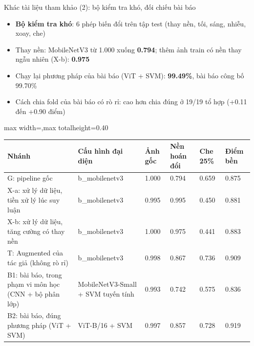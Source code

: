 \documentclass[aspectratio=169,10pt]{beamer}
\begin{document}
\begin{frame}{Khác tài liệu tham khảo (2): bộ kiểm tra khó, đối chiếu bài báo}
\begin{itemize}\footnotesize
\item \textbf{Bộ kiểm tra khó}: 6 phép biến đổi trên tập test (thay nền, tối, sáng, nhiễu, xoay, che)
\item Thay nền: MobileNetV3 từ 1.000 xuống \textbf{0.794}; thêm ảnh train có nền thay ngẫu nhiên (X-b): \textbf{0.975}
\item Chạy lại phương pháp của bài báo (ViT + SVM): \textbf{99.49\%}, bài báo công bố 99.70\%
\item Cách chia fold của bài báo có rò rỉ: cao hơn chia đúng ở 19/19 tổ hợp (+0.11 đến +0.90 điểm)
\end{itemize}
\begin{center}\begin{adjustbox}{max width=\linewidth,max totalheight=0.40\textheight}
\begin{tabular}{>{\raggedright\arraybackslash}p{5.4cm} >{\raggedright\arraybackslash}p{3.4cm} l l l l}\toprule
\textbf{Nhánh} & \textbf{Cấu hình đại diện} & \textbf{Ảnh gốc} & \textbf{Nền hoán đổi} & \textbf{Che 25\%} & \textbf{Điểm bền} \\ \midrule
G: pipeline gốc & b\_mobilenetv3 & 1.000 & 0.794 & 0.659 & 0.875 \\
X-a: xử lý dữ liệu, tiền xử lý lúc suy luận & b\_mobilenetv3 & 0.995 & 0.995 & 0.450 & 0.881 \\
X-b: xử lý dữ liệu, tăng cường có thay nền & b\_mobilenetv3 & 1.000 & 0.975 & 0.441 & 0.883 \\
T: Augmented của tác giả (không rò rỉ) & b\_mobilenetv3 & 0.998 & 0.867 & 0.736 & 0.909 \\
B1: bài báo, trong phạm vi môn học (CNN + bộ phân lớp) & MobileNetV3-Small + SVM tuyến tính & 0.993 & 0.742 & 0.575 & 0.836 \\
B2: bài báo, đúng phương pháp (ViT + SVM) & ViT-B/16 + SVM & 0.997 & 0.857 & 0.728 & 0.919 \\
\bottomrule\end{tabular}
\end{adjustbox}\end{center}
\end{frame}
\end{document}
